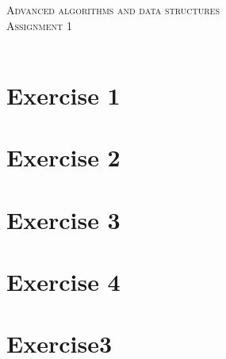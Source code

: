 \documentclass{article}
\begin{document}
\begin{center}
\textsc{\Large Advanced algorithms and data structures}\\[0.5cm]
\textsc{\large Assignment 1}\\[0.5cm]
\textsc{\large }\\[0.5cm]
\vspace{1 cm}
\end{center}

\section*{Exercise 1}

\section*{Exercise 2}



\section*{Exercise 3}
\section*{Exercise 4}



\section*{Exercise3}
\end{document}
